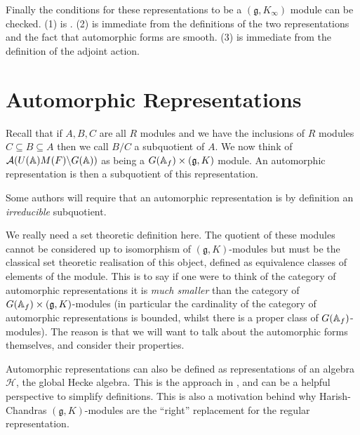 Finally the conditions for these representations to be a \((\mathfrak{g}, K_\infty)\) module can be checked. (1) is \cite[Thm. 6.3.4]{getzIntroductionAutomorphicRepresentations2024}. (2) is immediate from the definitions of the two representations and the fact that automorphic forms are smooth. (3) is immediate from the definition of the adjoint action.


\section{Automorphic Representations}
Recall that if \(A, B, C\) are all \(R\) modules and we have the inclusions of \(R\) modules \(C \subseteq B \subseteq A\) then we call \(B/C\) a subquotient of \(A\). We now think of \(\mathcal{A}(U(\A)M(F)\backslash G(\A))\) as being a \(G(\A_f)\times (\mathfrak{g}, K)\) module. An automorphic representation is then a subquotient of this representation.
\begin{remark}
    Some authors will require that an automorphic representation is by definition an \textit{irreducible} subquotient.
\end{remark}
\begin{remark}
    We really need a set theoretic definition here. The quotient of these modules cannot be considered up to isomorphism of \((\mathfrak{g}, K)\)-modules but must be the classical set theoretic realisation of this object, defined as equivalence classes of elements of the module. This is to say if one were to think of the category of automorphic representations it is \textit{much smaller} than the category of \(G(\A_f)\times (\mathfrak{g}, K)\)-modules (in particular the cardinality of the category of automorphic representations is bounded, whilst there is a proper class of \(G(\A_f)\)-modules). The reason is that we will want to talk about the automorphic forms themselves, and consider their properties.
\end{remark}

\begin{remark}
    Automorphic representations can also be defined as representations of an algebra \(\mathcal{H}\), the global Hecke algebra. This is the approach in \cite[I.II(4.6)]{borelAutomorphicFormsRepresentations1979}, and can be a helpful perspective to simplify definitions. This is also a motivation behind why Harish-Chandras \((\mathfrak{g}, K)\)-modules are the ``right'' replacement for the regular representation. 
\end{remark}

